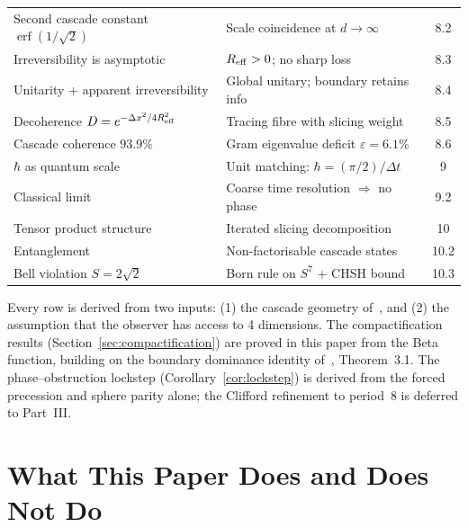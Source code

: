 \documentclass[12pt,a4paper]{article}
\begin{document}
\begin{center}
\begin{tabular}{>{\raggedright\arraybackslash}p{6cm}>{\raggedright\arraybackslash}p{6.5cm}c}
Second cascade constant $\operatorname{erf}(1/\sqrt{2})$ & Scale coincidence at $d\to\infty$ & 8.2 \\
Irreversibility is asymptotic & $R_{\rm eff}>0$; no sharp loss & 8.3 \\
Unitarity + apparent irreversibility & Global unitary; boundary retains info & 8.4 \\
Decoherence $D=e^{-\Delta x^2/4R_{\rm eff}^2}$ & Tracing fibre with slicing weight & 8.5 \\
Cascade coherence $93.9\%$ & Gram eigenvalue deficit $\varepsilon=6.1\%$ & 8.6 \\
$\hbar$ as quantum scale & Unit matching: $\hbar=(\pi/2)/\Delta t$ & 9 \\
Classical limit & Coarse time resolution $\Rightarrow$ no phase & 9.2 \\
Tensor product structure & Iterated slicing decomposition & 10 \\
Entanglement & Non-factorisable cascade states & 10.2 \\
Bell violation $S=2\sqrt{2}$ & Born rule on $S^7$ + CHSH bound & 10.3 \\
\bottomrule
\end{tabular}
\end{center}

Every row is derived from two inputs: (1) the cascade geometry of~\cite{part0}, and
(2) the assumption that the observer has access to 4 dimensions. The compactification
results (Section~\ref{sec:compactification}) are proved in this paper from the Beta
function, building on the boundary dominance identity of~\cite{part0}, Theorem~3.1.
The phase--obstruction lockstep (Corollary~\ref{cor:lockstep}) is derived from the
forced precession and sphere parity alone; the Clifford refinement to period~8 is
deferred to Part~III.

\section{What This Paper Does and Does Not Do}\label{sec:what-this-paper-does-and-does-not-do}
\end{document}
